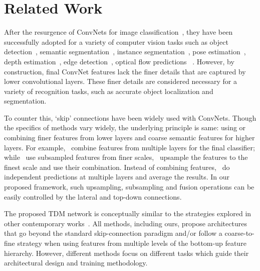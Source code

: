 \documentclass[10pt,twocolumn,letterpaper]{article}
\begin{document}
\vspace{-0.01in}
\section{Related Work}\label{sec:related}
\vspace{-0.01in}

After the resurgence of ConvNets for image classification~\cite{alexnet,imagenet}, they have been successfully adopted for a variety of computer vision tasks such as object detection~\cite{rcnn,girshick2015fast,ren2015faster,szegedy2013deep}, semantic segmentation~\cite{deeplab,liu2015parsenet,long2015fully,badrinarayanan2015segnet}, instance segmentation~\cite{sds,hariharan2015hypercolumns,pinheiro2015learning}, pose estimation~\cite{toshev2014deeppose,tompson2014joint}, depth estimation~\cite{eigen2015predicting,wang2015designing}, edge detection~\cite{xie2015holistically}, optical flow predictions~\cite{fischer2015flownet,ranjan2016optical} \etc. 
However, by construction, final ConvNet features lack the finer details that are captured by lower convolutional layers. These finer details are considered necessary for a variety of recognition tasks, such as accurate object localization and segmentation.

To counter this, `skip' connections have been widely used with ConvNets. Though the specifics of methods vary widely, the underlying principle is same: using or combining finer features from lower layers and coarse semantic features for higher layers. For example,~\cite{sermanet2013pedestrian,bell2015inside,farabet2013learning,hariharan2015hypercolumns} combine features from multiple layers for the final classifier; while~\cite{sermanet2013pedestrian,bell2015inside} use subsampled features from finer scales,~\cite{farabet2013learning,hariharan2015hypercolumns} upsample the features to the finest scale and use their combination. Instead of combining features,~\cite{long2015fully,xie2015holistically,liu2015parsenet} do independent predictions at multiple layers and average the results.
In our proposed framework, such upsampling, subsampling and fusion operations can be easily controlled by the lateral and top-down connections.


The proposed TDM network is conceptually similar to the strategies explored in other contemporary works~\cite{pinheiro2016learning,ranjan2016optical,badrinarayanan2015segnet,lin2016feature,ronneberger2015unet}. All methods, including ours, propose architectures that go beyond the standard skip-connection paradigm and/or follow a coarse-to-fine strategy when using features from multiple levels of the bottom-up feature hierarchy. However, different methods focus on different tasks which guide their architectural design and training methodology.
\end{document}
